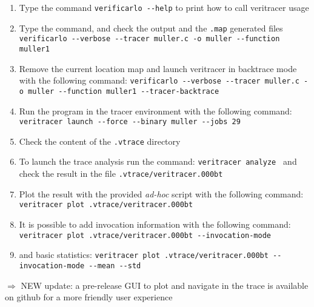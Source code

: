 \begin{question}
    \begin{enumerate}
        \item Type the command {\tt verificarlo -{}-help} to print how to call veritracer usage
        \item Type the command, and check the output and the {\tt .map} generated files \newline
        {\tt verificarlo -{}-verbose -{}-tracer muller.c -o muller -{}-function muller1 }
        \item Remove the current location map and launch veritracer in backtrace mode with the following command: {\tt verificarlo -{}-verbose -{}-tracer muller.c -o muller -{}-function muller1  -{}-tracer-backtrace}
        \item Run the program in the tracer environment with the following command: \newline
        {\tt veritracer launch -{}-force -{}-binary muller -{}-jobs 29}
        \item Check the content of the {\tt .vtrace} directory
        \item To launch the trace analysis run the command: {\tt veritracer analyze } and check the result in  the file {\tt .vtrace/veritracer.000bt}
        \item Plot the result with the provided {\it ad-hoc} script with the following command: \newline
        {\tt veritracer plot .vtrace/veritracer.000bt}
        \item It is possible to add invocation information with the following command: \newline
        {\tt veritracer plot .vtrace/veritracer.000bt -{}-invocation-mode}
        \item and basic statistics: {\tt veritracer plot .vtrace/veritracer.000bt -{}-invocation-mode -{}-mean -{}-std}





    \end{enumerate}
    $\Rightarrow$ NEW update: a pre-release GUI to plot and navigate in the trace is available on github for a more friendly user experience
\end{question}

